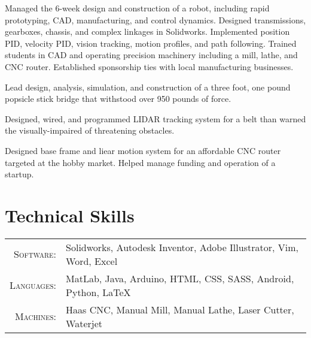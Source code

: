 \documentclass{resume_template}
\begin{document}
Managed the 6-week design and construction of a robot, including rapid prototyping, CAD, manufacturing, and control dynamics. Designed transmissions, gearboxes, chassis, and complex linkages in Solidworks. Implemented position PID, velocity PID, vision tracking, motion profiles, and path following. Trained students in CAD and operating precision machinery including a mill, lathe, and CNC router. Established sponsorship ties with local manufacturing businesses.

Lead design, analysis, simulation, and construction of a three foot, one pound popsicle stick bridge that withstood over 950 pounds of force.


Designed, wired, and programmed LIDAR tracking system for a belt than warned the visually-impaired of threatening obstacles.

Designed base frame and liear motion system for an affordable CNC router targeted at the hobby market. Helped manage funding and operation of a startup.

\section{Technical Skills}
\begin{tabular}{rl}
  \textsc{Software:}   & Solidworks, Autodesk Inventor, Adobe Illustrator, Vim, Word, Excel\\
  \textsc{Languages:}  & MatLab, Java, Arduino, HTML, CSS, SASS, Android, Python, \LaTeX\\
  \textsc{Machines:}   & Haas CNC, Manual Mill, Manual Lathe, Laser Cutter, Waterjet\\
\end{tabular}
\end{document}
